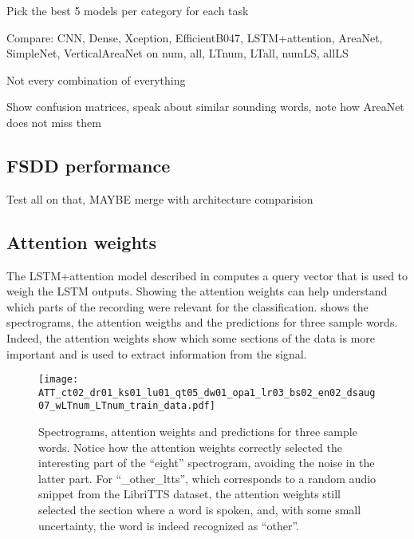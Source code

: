 Pick the best 5 models per category for each task

Compare: CNN, Dense, Xception, EfficientB047, LSTM+attention, AreaNet, SimpleNet,
VerticalAreaNet on num, all, LTnum, LTall, numLS, allLS

Not every combination of everything

Show confusion matrices, speak about similar sounding words, note how AreaNet
does not miss them

% 


\subsection{FSDD performance}

Test all on that, MAYBE merge with architecture comparision

\subsection{Attention weights}



The LSTM+attention model described in  computes a query
vector that is used to weigh the LSTM outputs. Showing the attention weights
can help understand which parts of the recording were relevant for the
classification.
 shows the spectrograms, the attention
weigths and the predictions for three sample words.
Indeed, the attention weights show which some sections of the data is more important
and is used to extract information from the signal.

\begin{figure*}[t!]
    \centering
    \texttt{[image: ATT\_ct02\_dr01\_ks01\_lu01\_qt05\_dw01\_opa1\_lr03\_bs02\_en02\_dsaug07\_wLTnum\_LTnum\_train\_data.pdf]}
    \caption{Spectrograms, attention weights and predictions for three sample words.
    Notice how the attention weights correctly selected the interesting part of
    the ``eight'' spectrogram, avoiding the noise in the latter part.
    For ``\_other\_ltts'', which corresponds to a random audio snippet from the LibriTTS
    dataset, the attention weights still selected the section where a word is spoken,
    and, with some small uncertainty, the word is indeed recognized as ``other''.}%
    \label{fig:attention_weights_standard}
\end{figure*}

